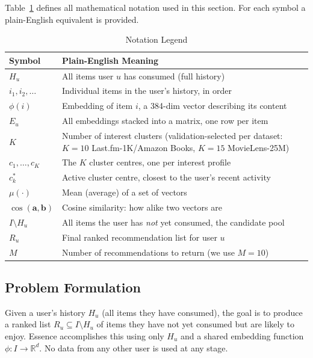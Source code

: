 \documentclass[11pt,a4paper]{article}
\begin{document}
Table~\ref{tab:notation} defines all mathematical notation used in this
section. For each symbol a plain-English equivalent is provided.

\begin{table}[H]
\centering
\caption{Notation Legend}
\label{tab:notation}
\begin{tabular}{lp{12.2cm}}
\toprule
\textbf{Symbol} & \textbf{Plain-English Meaning} \\
\midrule
$H_u$                     & All items user $u$ has consumed (full history) \\
$i_1, i_2, \ldots$        & Individual items in the user's history, in order \\
$\phi(i)$                 & Embedding of item $i$, a 384-dim vector describing its content \\
$E_u$                     & All embeddings stacked into a matrix, one row per item \\
$K$                       & Number of interest clusters (validation-selected per dataset: $K=10$ Last.fm-1K/Amazon Books, $K=15$ MovieLens-25M) \\
$c_1, \ldots, c_K$        & The $K$ cluster centres, one per interest profile \\
$c_k^*$                   & Active cluster centre, closest to the user's recent activity \\
$\mu(\cdot)$              & Mean (average) of a set of vectors \\
$\cos(\mathbf{a},\mathbf{b})$ & Cosine similarity: how alike two vectors are \\
$I \setminus H_u$         & All items the user has \emph{not} yet consumed, the candidate pool \\
$R_u$                     & Final ranked recommendation list for user $u$ \\
$M$                       & Number of recommendations to return (we use $M=10$) \\
\bottomrule
\end{tabular}
\end{table}

\subsection{Problem Formulation}
Given a user's history $H_u$ (all items they have consumed), the
goal is to produce a ranked list $R_u \subseteq I \setminus H_u$ of items
they have not yet consumed but are likely to enjoy. Essence accomplishes this
using only $H_u$ and a shared embedding function $\phi: I \to \mathbb{R}^d$.
No data from any other user is used at any stage.
\end{document}
